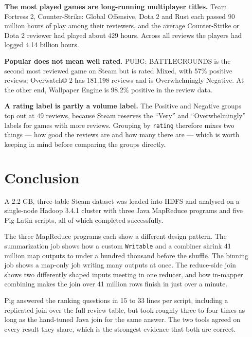 \documentclass[11pt,a4paper]{article}
\newcommand{\code}[1]{\texttt{#1}}
\begin{document}
\textbf{The most played games are long-running multiplayer titles.} Team Fortress 2, Counter-Strike:
Global Offensive, Dota 2 and Rust each passed 90 million hours of play among their reviewers, and the
average Counter-Strike or Dota 2 reviewer had played about 429 hours. Across all reviews the players
had logged 4.14 billion hours.

\textbf{Popular does not mean well rated.} PUBG: BATTLEGROUNDS is the second most reviewed game on
Steam but is rated Mixed, with 57\% positive reviews; Overwatch® 2 has 181,198 reviews and is
Overwhelmingly Negative. At the other end, Wallpaper Engine is 98.2\% positive in the review data.

\textbf{A rating label is partly a volume label.} The Positive and Negative groups top out at 49
reviews, because Steam reserves the ``Very'' and ``Overwhelmingly'' labels for games with more reviews.
Grouping by \code{rating} therefore mixes two things — how good the reviews are and how many there are
— which is worth keeping in mind before comparing the groups directly.

\section{Conclusion}

A 2.2 GB, three-table Steam dataset was loaded into HDFS and analysed on a single-node Hadoop 3.4.1
cluster with three Java MapReduce programs and five Pig Latin scripts, all of which completed
successfully.

The three MapReduce programs each show a different design pattern. The summarization job shows how a
custom \code{Writable} and a combiner shrink 41 million map outputs to under a hundred thousand before
the shuffle. The binning job shows a map-only job writing many outputs at once. The reduce-side join
shows two differently shaped inputs meeting in one reducer, and how in-mapper combining makes the
join over 41 million rows finish in just over a minute.

Pig answered the ranking questions in 15 to 33 lines per script, including a replicated join over the
full review table, but took roughly three to four times as long as the hand-tuned Java join for the
same answer. The two tools agreed on every result they share, which is the strongest evidence that
both are correct.

\end{document}
